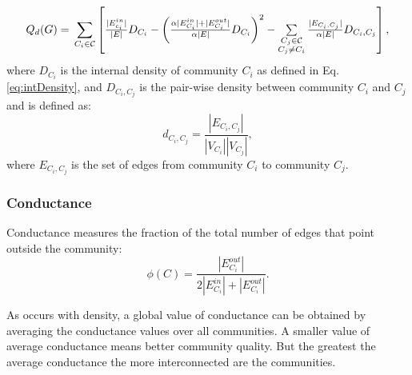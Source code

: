 \begin{equation}\label{eq:modDensity}
\begin{array}{lll}
Q_{d} (G) =   \sideset{}{}\sum\limits_{C_i \in \mathcal{C}} \left[\frac{|E_{c_i}^{in}|}{|E|}D_{C_i} -    \left( \frac{\alpha |E_{C_i}^{in}| + |E_{C_i}^{out}|}{\alpha |E|}D_{C_i}\right)^2 
 - \sum\limits_{\substack{C_j \in \mathcal{C}\\C_j\neq C_i}} \frac{|E_{C_i,C_j}|}{\alpha|E|}D_{C_i,C_j}\right],\\
\end{array}             
\end{equation} \vspace{4mm}
where $D_{C_i}$ is the internal density of community $C_i$ as defined in Eq. \ref{eq:intDensity}, and $D_{C_i,C_j}$ is  the pair-wise density between community $C_i$ and $C_j$ and is defined as:
$$ d_{C_i,C_j} = \frac{|E_{C_i,C_j}|}{|V_{C_i}| |V_{C_j}|}, $$
where $E_{C_i,C_j}$ is the set of edges from community $C_i$ to
community $C_j$. 


\subsubsection*{Conductance}
\label{subsec:conductance}
Conductance  measures the fraction of the
total number of edges that point outside the community:  
\begin{equation}
\label{eq:conductance}
\phi (C) =\frac{|E_{C_i}^{out}|}{2|E_{C_i}^{in}| +|E_{C_i}^{out}|}.
\end{equation}

As occurs with density, a global value of conductance can be obtained by averaging the conductance values over all communities. A smaller value of average conductance means better community quality. But the greatest the average conductance the more interconnected are the communities. 